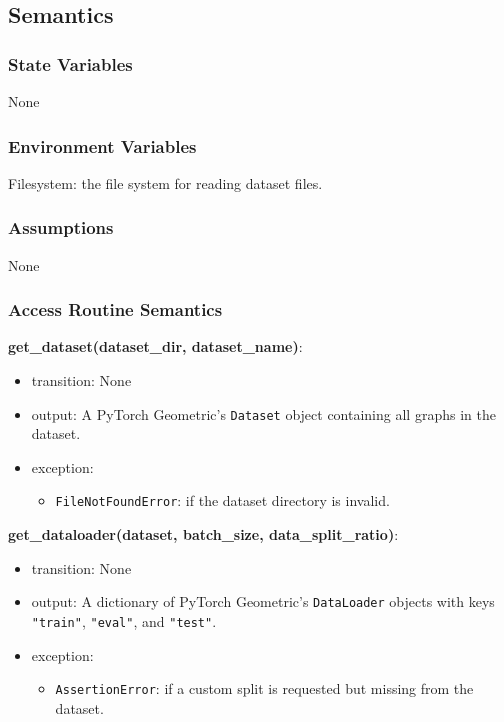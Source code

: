 \documentclass[12pt, titlepage]{article}
\begin{document}
\subsection{Semantics}

\subsubsection{State Variables}
None

\subsubsection{Environment Variables}
Filesystem: the file system for reading dataset files.

\subsubsection{Assumptions}
None

\subsubsection{Access Routine Semantics}

\noindent \textbf{get\_dataset(dataset\_dir, dataset\_name)}:
\begin{itemize}
  \item transition: None
  \item output: A PyTorch Geometric's \texttt{Dataset} object containing all graphs in the dataset.
  \item exception:
  \begin{itemize}
    \item \texttt{FileNotFoundError}: if the dataset directory is invalid.
  \end{itemize}
\end{itemize}

\noindent \textbf{get\_dataloader(dataset, batch\_size, data\_split\_ratio)}:
\begin{itemize}
  \item transition: None
  \item output: A dictionary of PyTorch Geometric's \texttt{DataLoader} objects with keys \texttt{"train"}, \texttt{"eval"}, and \texttt{"test"}.
  \item exception:
  \begin{itemize}
    \item \texttt{AssertionError}: if a custom split is requested but missing from the dataset.
  \end{itemize}
\end{itemize}
\end{document}
